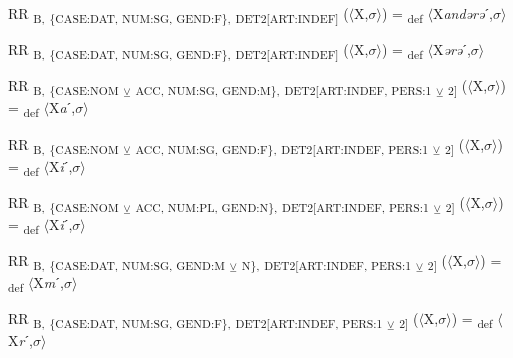 {\begin{exe}
 RR \textsubscript{B,} \textsubscript{\{CASE:DAT, NUM:SG, GEND:F\},} \textsubscript{DET2[ART:INDEF]} ($\langle$X,$\sigma $$\rangle$) = \textsubscript{def} $\langle$X\textit{andərə}ˊ,$\sigma $$\rangle$
\end{exe}

\begin{exe}
 RR \textsubscript{B,} \textsubscript{\{CASE:DAT, NUM:SG, GEND:F\},} \textsubscript{DET2[ART:INDEF]} ($\langle$X,$\sigma $$\rangle$) = \textsubscript{def} $\langle$X\textit{ərə}ˊ,$\sigma $$\rangle$
\end{exe}

\begin{exe}
 RR \textsubscript{B,} \textsubscript{\{CASE:NOM} \textsubscript{${\veebar}$}\textsubscript{ ACC, NUM:SG, GEND:M\},} \textsubscript{DET2[ART:INDEF, PERS:1} \textsubscript{${\veebar}$}\textsubscript{ 2]} ($\langle$X,$\sigma $$\rangle$) = \textsubscript{def} $\langle$X\textit{a}ˊ,$\sigma $$\rangle$
\end{exe}

\begin{exe}
 RR \textsubscript{B,} \textsubscript{\{CASE:NOM} \textsubscript{${\veebar}$}\textsubscript{ ACC, NUM:SG, GEND:F\},} \textsubscript{DET2[ART:INDEF, PERS:1} \textsubscript{${\veebar}$}\textsubscript{ 2]} ($\langle$X,$\sigma $$\rangle$) = \textsubscript{def} $\langle$X\textit{i}ˊ,$\sigma $$\rangle$
\end{exe}

\begin{exe}
 RR \textsubscript{B,} \textsubscript{\{CASE:NOM} \textsubscript{${\veebar}$}\textsubscript{ ACC, NUM:PL, GEND:N\},} \textsubscript{DET2[ART:INDEF, PERS:1} \textsubscript{${\veebar}$}\textsubscript{ 2]} ($\langle$X,$\sigma $$\rangle$) = \textsubscript{def} $\langle$X\textit{i}ˊ,$\sigma $$\rangle$
\end{exe}

\begin{exe}
 RR \textsubscript{B,} \textsubscript{\{CASE:DAT, NUM:SG, GEND:M} \textsubscript{${\veebar}$}\textsubscript{ N\},} \textsubscript{DET2[ART:INDEF, PERS:1} \textsubscript{${\veebar}$}\textsubscript{ 2]} ($\langle$X,$\sigma $$\rangle$) = \textsubscript{def} $\langle$X\textit{m}ˊ,$\sigma $$\rangle$
\end{exe}

\begin{exe}
 RR \textsubscript{B,} \textsubscript{\{CASE:DAT, NUM:SG, GEND:F\},} \textsubscript{DET2[ART:INDEF, PERS:1} \textsubscript{${\veebar}$}\textsubscript{ 2]} ($\langle$X,$\sigma $$\rangle$) = \textsubscript{def} $\langle$X\textit{r}ˊ,$\sigma $$\rangle$
\end{exe}

}
